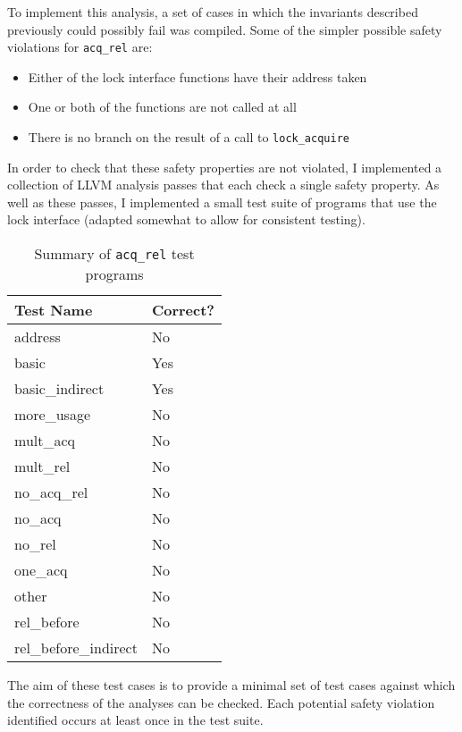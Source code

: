 To implement this analysis, a set of cases in which the invariants described
previously could possibly fail was compiled. Some of the simpler possible safety
violations for \texttt{acq_rel} are:
\begin{itemize}
  \item Either of the lock interface functions have their address taken
  \item One or both of the functions are not called at all
  \item There is no branch on the result of a call to
  \texttt{lock_acquire}
\end{itemize}

In order to check that these safety properties are not violated, I implemented a
collection of LLVM \cite{lattner_llvm:_2002} analysis passes that each check a
single safety property. As well as these passes, I implemented a small test
suite of programs that use the lock interface (adapted somewhat to allow for
consistent testing).

\begin{table}[ht]
  \centering
  \begin{tabularx}{\textwidth}{Z | Z}
    \toprule
    \textbf{Test Name} & \textbf{Correct?} \\
    \midrule
    address & No \\
    basic & Yes \\
    basic\_indirect & Yes \\
    more\_usage & No \\
    mult\_acq & No \\
    mult\_rel & No \\
    no\_acq\_rel & No \\
    no\_acq & No \\
    no\_rel & No \\
    one\_acq & No \\
    other & No \\
    rel\_before & No \\
    rel\_before\_indirect & No \\
    \bottomrule
  \end{tabularx}
  \caption{Summary of \texttt{acq_rel} test programs}
\end{table}

The aim of these test cases is to provide a minimal set of test cases
against which the correctness of the analyses can be checked. Each
potential safety violation identified occurs at least once in the test
suite.

